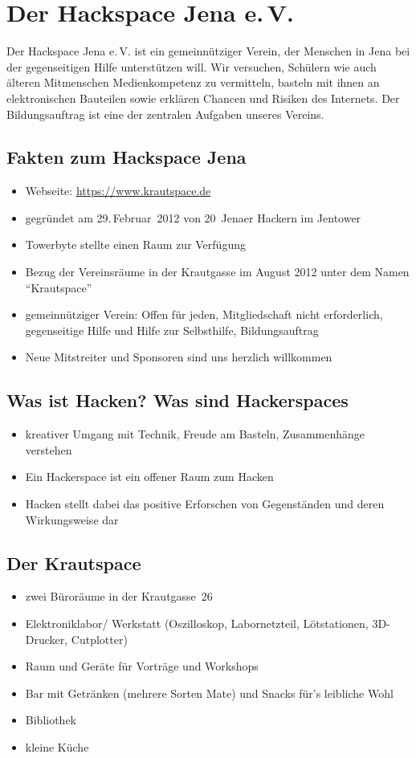 \documentclass[a4paper,12pt,twoside]{scrartcl}
\begin{document}
\thispagestyle{empty}
\section*{Der Hackspace Jena e.\,V.}
Der Hackspace Jena e.\,V. ist ein gemeinnütziger Verein, der Menschen
in Jena bei der gegenseitigen Hilfe unterstützen will. Wir versuchen,
Schülern wie auch älteren Mitmenschen Medienkompetenz zu vermitteln,
basteln mit ihnen an elektronischen Bauteilen sowie erklären Chancen
und Risiken des Internets. Der Bildungsauftrag ist eine der zentralen
Aufgaben unseres Vereins.

\subsection*{Fakten zum Hackspace Jena}
\begin{itemize}
\item Webseite: \url{https://www.krautspace.de}
\item gegründet am 29.\,Februar~2012 von 20~Jenaer Hackern im Jentower
\item Towerbyte stellte einen Raum zur Verfügung
\item Bezug der Vereinsräume in der Krautgasse im August 2012 unter
  dem Namen \enquote{Krautspace}
\item gemeinnütziger Verein: Offen für jeden, Mitgliedschaft nicht erforderlich, gegenseitige Hilfe und Hilfe zur Selbsthilfe, Bildungsauftrag
\item Neue Mitstreiter und Sponsoren sind uns herzlich willkommen
\end{itemize}
\subsection*{Was ist Hacken? Was sind Hackerspaces}
\begin{itemize}
\item kreativer Umgang mit Technik, Freude am Basteln, Zusammenhänge verstehen
\item Ein Hackerspace ist ein offener Raum zum Hacken
\item Hacken stellt dabei das positive Erforschen von Gegenständen und
  deren Wirkungsweise dar
\end{itemize}
\subsection*{Der Krautspace}
\begin{itemize}
\item zwei Büroräume in der Krautgasse~26
\item Elektroniklabor/ Werkstatt (Oszilloskop, Labornetzteil, Lötstationen, 3D-Drucker, Cutplotter)
\item Raum und Geräte für Vorträge und Workshops
\item Bar mit Getränken (mehrere Sorten Mate) und Snacks für's leibliche Wohl
\item Bibliothek
\item kleine Küche
\end{itemize}
\end{document}
